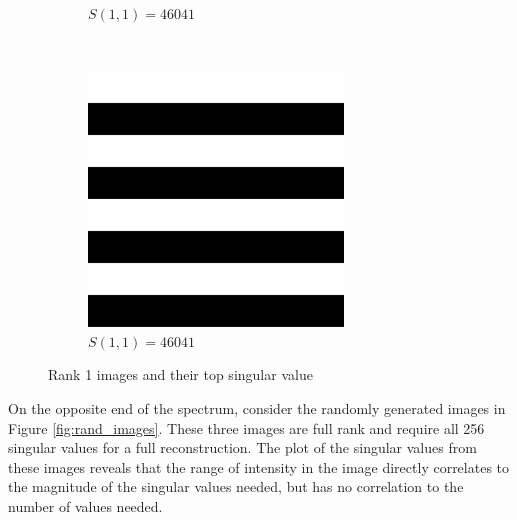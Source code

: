 \documentclass{report}
\begin{document}
\begin{figure}[H]
\begin{subfigure}[b]{0.2\textwidth}
        		\caption{$S(1,1) = 46041$}
        \end{subfigure}
        ~~~
        \begin{subfigure}[b]{0.2\textwidth}
                \includegraphics[width=\textwidth]{graphics/smallHorizontal.png}
                \caption{$S(1,1) = 46041$}
        \end{subfigure}
        \caption{Rank 1 images and their top singular value}
        \label{fig:rank1_images}
\end{figure}

On the opposite end of the spectrum, consider the randomly generated images in Figure \ref{fig:rand_images}. These three images are full rank and require all 256 singular values for a full reconstruction. The plot of the singular values from these images reveals that the range of intensity in the image directly correlates to the magnitude of the singular values needed, but has no correlation to the number of values needed.
\end{document}
